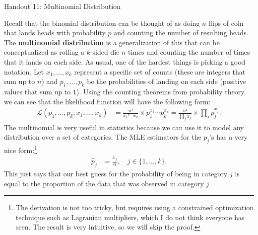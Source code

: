 \documentclass{tufte-handout}
\begin{document}
\justify

{\LARGE Handout 11: Multinomial Distribution}

\vspace*{18pt}

\noindent
Recall that the binomial distribution can be thought of as doing $n$
flips of coin that lands heads with probability $p$ and counting the
number of resulting heads. The \textbf{multinomial distribution} is
a generalization of this that can be conceptualized as rolling a
$k$-sided die $n$ times and counting the number of times that it lands
on each side. As usual, one of the hardest things is picking a good
notation. Let $x_1, \ldots, x_k$ represent a specific set of counts
(these are integers that sum up to $n$) and $p_1, \ldots, p_k$ be the
probabilities of landing on each side (positive values that sum up to
$1$). Using the counting theorems from probability theory, we can
see that the likelihood function will have the following form:
\begin{align*}
\mathcal{L}(p_1, \ldots, p_k; x_1, \ldots, x_k)
&= \frac{n!}{x_1! \cdots x_k} \times p_1^{x_1} \cdots p_k^{x_k}
= \frac{n!}{\prod_j x_j} \times \prod_j p_j^{x_j}.
\end{align*}
The multinomial is very useful in statistics because we can use it to
model any distribution over a set of categories. The MLE estimators
for the $p_j$'s has a very nice form:\footnote{
  The derivation is not too tricky, but requires using a constrained
  optimization technique such as Lagranian multipliers, which I do 
  not think everyone has seen. The result is very intuitive, so we
  will skip the proof.
}
\begin{align*}
\hat{p}_j &= \frac{x_j}{n}, \quad j \in \{1, \ldots, k \}.
\end{align*}
This just says that our best guess for the probability of being in
category $j$ is equal to the proportion of the data that was observed
in category $j$. 
\end{document}
